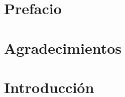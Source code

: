 \documentclass[11pt,a4paper,oneside,openright]{book}
\begin{document}


\chapter{Prefacio}

\chapter{Agradecimientos}

\tableofcontents
\listoffigures
\listoftables


\mainmatter
\chapter{Introducción}



\end{document}
